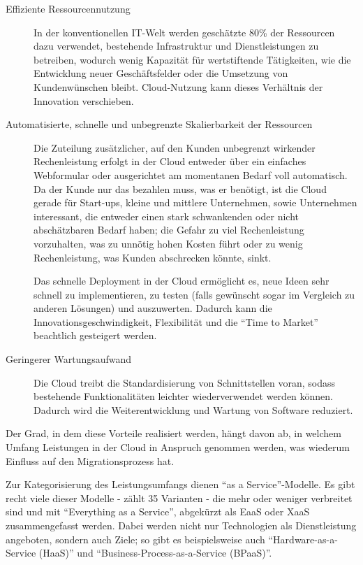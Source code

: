 \begin{description}
	\item[Effiziente Ressourcennutzung] In der konventionellen IT-Welt
werden geschätzte 80\% der Ressourcen dazu verwendet, bestehende Infrastruktur
und Dienstleistungen zu betreiben, wodurch wenig Kapazität für wertstiftende
Tätigkeiten, wie die Entwicklung neuer Geschäftsfelder oder die Umsetzung von
Kundenwünschen bleibt. Cloud-Nutzung kann
dieses Verhältnis der Innovation verschieben. 

	\item[Automatisierte, schnelle und unbegrenzte Skalierbarkeit der
Ressourcen] Die Zuteilung zusätzlicher, auf den Kunden unbegrenzt wirkender
Rechenleistung erfolgt in der Cloud entweder über ein einfaches Webformular oder
ausgerichtet am momentanen Bedarf voll automatisch. Da der Kunde nur das
bezahlen muss, was er benötigt, ist die Cloud gerade für Start-ups, kleine und
mittlere Unternehmen, sowie Unternehmen interessant, die entweder einen stark
schwankenden oder nicht abschätzbaren Bedarf haben; die Gefahr zu viel
Rechenleistung vorzuhalten, was zu unnötig hohen Kosten führt oder zu wenig
Rechenleistung, was Kunden abschrecken könnte,
sinkt.

Das schnelle Deployment in der Cloud ermöglicht es, neue Ideen sehr
schnell zu implementieren, zu testen (falls gewünscht sogar im Vergleich zu
anderen Lösungen) und auszuwerten. Dadurch kann die Innovationsgeschwindigkeit,
Flexibilität und die "`Time to Market"' beachtlich gesteigert werden.

	\item[Geringerer Wartungsaufwand] Die Cloud treibt die Standardisierung
von Schnittstellen voran, sodass bestehende Funktionalitäten leichter
wiederverwendet werden können. Dadurch wird die Weiterentwicklung und Wartung
von Software reduziert. 
\end{description}

Der Grad, in dem diese Vorteile realisiert werden, hängt davon ab, in welchem
Umfang Leistungen in der Cloud in Anspruch genommen werden, was wiederum
Einfluss auf den Migrationsprozess hat. 

Zur Kategorisierung des Leistungsumfangs dienen "`as a Service"'-Modelle. Es
gibt recht viele dieser Modelle -  zählt 35
Varianten - die mehr oder weniger verbreitet sind und mit "`Everything as a
Service"', abgekürzt als EaaS oder XaaS zusammengefasst werden. Dabei werden
nicht nur Technologien als Dienstleistung angeboten, sondern auch Ziele; so gibt
es beispielsweise auch "`Hardware-as-a-Service (HaaS)"' und
"`Business-Process-as-a-Service (BPaaS)"'.
\\

